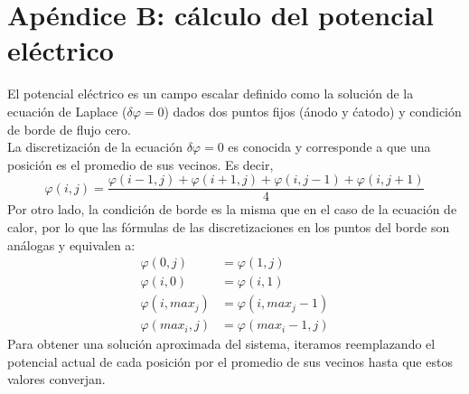\documentclass[a4paper]{article}
\begin{document}
\newpage
\section{Apéndice B: cálculo del potencial eléctrico}

El potencial eléctrico es un campo escalar definido como la solución de la ecuación de Laplace ($\delta \varphi = 0$) dados dos puntos fijos (ánodo y ćatodo) y condición de borde de flujo cero.\\
La discretización de la ecuación $\delta \varphi = 0$ es conocida y corresponde a que una posición es el promedio de sus vecinos. Es decir, $$\varphi(i, j) = \frac{\varphi(i-1, j) + \varphi(i+1, j) + \varphi(i, j-1) + \varphi(i, j+1)}{4}$$
Por otro lado, la condición de borde es la misma que en el caso de la ecuación de calor, por lo que las fórmulas de las discretizaciones en los puntos del borde son análogas y equivalen a:
\begin{equation*}
\begin{aligned}
\varphi(0,j) & = \varphi(1,j) \\ 
\varphi(i,0) & = \varphi(i,1) \\
\varphi(i,max_j) & = \varphi(i,max_j-1) \\ 
\varphi(max_i,j) & = \varphi(max_i-1,j)
\end{aligned}
\end{equation*}
Para obtener una solución aproximada del sistema, iteramos reemplazando el potencial actual de cada posición por el promedio de sus vecinos hasta que estos valores converjan.
\end{document}
